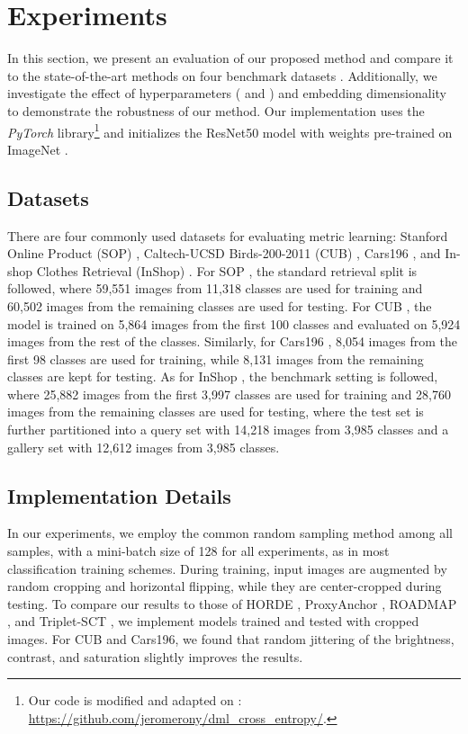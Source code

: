 \documentclass[10pt,twocolumn,letterpaper]{article}
\begin{document}
\section{Experiments}
\label{sec:experiments}

In this section, we present an evaluation of our proposed method and compare it to the state-of-the-art methods on four benchmark datasets \cite{liftstruct,cub,cars,inshop}. Additionally, we investigate the effect of hyperparameters ( and ) and embedding dimensionality to demonstrate the robustness of our method. Our implementation uses the \textit{PyTorch} library\footnote{Our code is modified and adapted on \cite{ce}: \url{https://github.com/jeromerony/dml_cross_entropy/}.} and initializes the ResNet50 \cite{resnet} model with weights pre-trained on ImageNet \cite{mocov3}. 

\subsection{Datasets}

There are four commonly used datasets for evaluating metric learning: Stanford Online Product (SOP) \cite{liftstruct}, Caltech-UCSD Birds-200-2011 (CUB) \cite{cub}, Cars196 \cite{cars}, and In-shop Clothes Retrieval (InShop) \cite{inshop}. For SOP \cite{liftstruct}, the standard retrieval split is followed, where 59,551 images from 11,318 classes are used for training and 60,502 images from the remaining classes are used for testing. For CUB \cite{cub}, the model is trained on 5,864 images from the first 100 classes and evaluated on 5,924 images from the rest of the classes. Similarly, for Cars196 \cite{cars}, 8,054 images from the first 98 classes are used for training, while 8,131 images from the remaining classes are kept for testing. As for InShop \cite{inshop}, the benchmark setting is followed, where 25,882 images from the first 3,997 classes are used for training and 28,760 images from the remaining classes are used for testing, where the test set is further partitioned into a query set with 14,218 images from 3,985 classes and a gallery set with 12,612 images from 3,985 classes.

\subsection{Implementation Details}

In our experiments, we employ the common random sampling method among all samples, with a mini-batch size of 128 for all experiments, as in most classification training schemes. During training, input images are augmented by random cropping and horizontal flipping, while they are center-cropped during testing. To compare our results to those of HORDE \cite{horde}, ProxyAnchor \cite{proxyanchor}, ROADMAP \cite{roadmap}, and Triplet-SCT \cite{sct}, we implement models trained and tested with  cropped images. For CUB and Cars196, we found that random jittering of the brightness, contrast, and saturation slightly improves the results.
\end{document}
